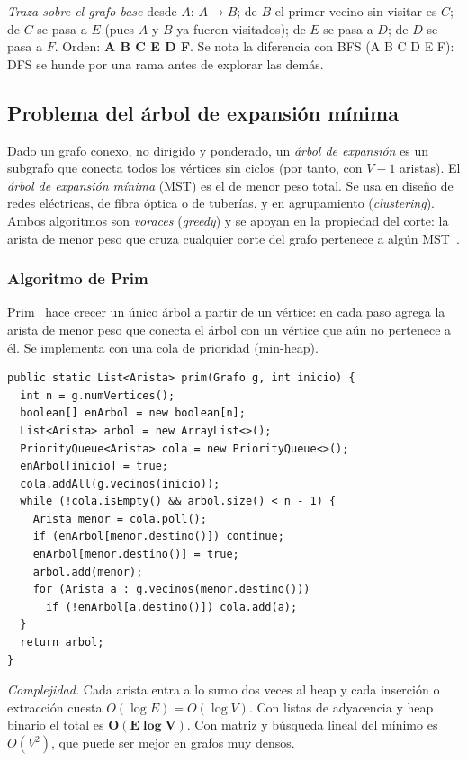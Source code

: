 \documentclass[conference]{IEEEtran}
\begin{document}
\emph{Traza sobre el grafo base} desde $A$: $A\to B$; de $B$ el primer vecino sin visitar es $C$; de $C$ se pasa a $E$ (pues $A$ y $B$ ya fueron visitados); de $E$ se pasa a $D$; de $D$ se pasa a $F$. Orden: \textbf{A B C E D F}. Se nota la diferencia con BFS (A B C D E F): DFS se hunde por una rama antes de explorar las demás.

\subsection{Problema del árbol de expansión mínima}
Dado un grafo conexo, no dirigido y ponderado, un \emph{árbol de expansión} es un subgrafo que conecta todos los vértices sin ciclos (por tanto, con $V-1$ aristas). El \emph{árbol de expansión mínima} (MST) es el de menor peso total. Se usa en diseño de redes eléctricas, de fibra óptica o de tuberías, y en agrupamiento (\emph{clustering}). Ambos algoritmos son \emph{voraces} (\emph{greedy}) y se apoyan en la propiedad del corte: la arista de menor peso que cruza cualquier corte del grafo pertenece a algún MST~\cite{cormen,sedgewick}.

\subsubsection{Algoritmo de Prim}
Prim~\cite{prim} hace crecer un único árbol a partir de un vértice: en cada paso agrega la arista de menor peso que conecta el árbol con un vértice que aún no pertenece a él. Se implementa con una cola de prioridad (min-heap).

\begin{lstlisting}[caption={Prim (ArbolExpansionMinima.java)}]
public static List<Arista> prim(Grafo g, int inicio) {
  int n = g.numVertices();
  boolean[] enArbol = new boolean[n];
  List<Arista> arbol = new ArrayList<>();
  PriorityQueue<Arista> cola = new PriorityQueue<>();
  enArbol[inicio] = true;
  cola.addAll(g.vecinos(inicio));
  while (!cola.isEmpty() && arbol.size() < n - 1) {
    Arista menor = cola.poll();
    if (enArbol[menor.destino()]) continue;
    enArbol[menor.destino()] = true;
    arbol.add(menor);
    for (Arista a : g.vecinos(menor.destino()))
      if (!enArbol[a.destino()]) cola.add(a);
  }
  return arbol;
}
\end{lstlisting}

\emph{Complejidad.} Cada arista entra a lo sumo dos veces al heap y cada inserción o extracción cuesta $O(\log E)=O(\log V)$. Con listas de adyacencia y heap binario el total es $\mathbf{O(E\log V)}$. Con matriz y búsqueda lineal del mínimo es $O(V^2)$, que puede ser mejor en grafos muy densos.
\end{document}
